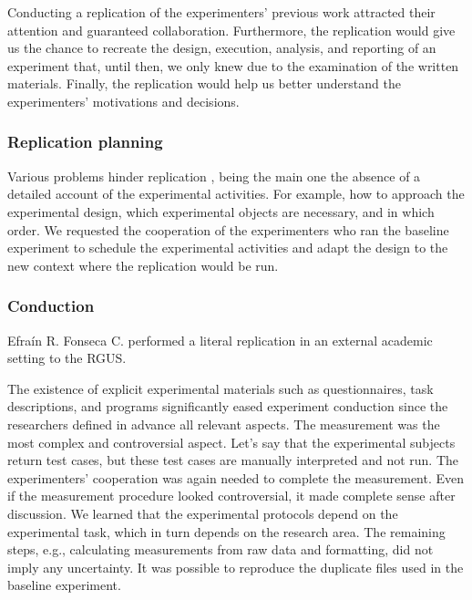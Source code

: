 Conducting a replication of the experimenters' previous work attracted their attention and guaranteed collaboration. Furthermore, the replication would give us the chance to recreate the design, execution, analysis, and reporting of an experiment that, until then, we only knew due to the examination of the written materials. Finally, the replication would help us better understand the experimenters' motivations and decisions.

\subsubsection{Replication planning}
Various problems hinder replication \cite{Gallardo-2012-CG-PL-SE} \cite{Vegas-2006-communication-researchers} \cite{Miller-2005-replicating-SE-experiments} \cite{Gomez-2014-understanding-replication} \cite{Demagalhaes-2015-replications-SE} \cite{Carver-2010-guidelines-replication-SE}, being the main one the absence of a detailed account of the experimental activities. For example, how to approach the experimental design, which experimental objects are necessary, and in which order. We requested the cooperation of the experimenters who ran the baseline experiment to schedule the experimental activities and adapt the design to the new context where the replication would be run.

\subsubsection{Conduction}
Efra\'in R. Fonseca C. performed a literal replication \cite{Gomez-2014-understanding-replication} in an external academic setting to the RGUS.

The existence of explicit experimental materials such as questionnaires, task descriptions, and programs significantly eased experiment conduction since the researchers defined in advance all relevant aspects. The measurement was the most complex and controversial aspect. Let's say that the experimental subjects return test cases, but these test cases are manually interpreted and not run. The experimenters' cooperation was again needed to complete the measurement. Even if the measurement procedure looked controversial, it made complete sense after discussion. We learned that the experimental protocols depend on the experimental task, which in turn depends on the research area. The remaining steps, e.g., calculating measurements from raw data and formatting, did not imply any uncertainty. It was possible to reproduce the duplicate files used in the baseline experiment.


